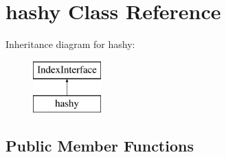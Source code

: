\section{hashy Class Reference}
\label{classhashy}
Inheritance diagram for hashy\+:\begin{figure}[H]
\begin{center}
\leavevmode
\includegraphics[height=2.000000cm]{classhashy}
\end{center}
\end{figure}
\subsection*{Public Member Functions}
